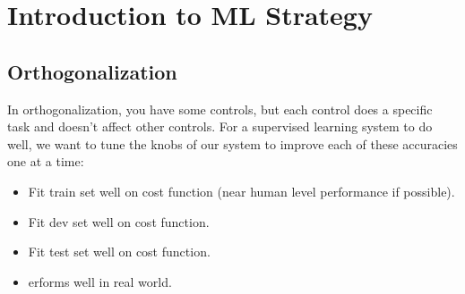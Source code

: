 \section{Introduction to ML Strategy}

\subsection{Orthogonalization}

In orthogonalization, you have some controls, but each control does a specific task and doesn't affect other controls. For a supervised learning system to do well, we want to tune the knobs of our system to improve each of these accuracies one at a time:

\begin{itemize}[wide, labelwidth=!, labelindent=0pt]
\itemsep0em 
    \item Fit train set well on cost function (near human level performance if possible).
    \item Fit dev set well on cost function.
    \item Fit test set well on cost function.
    \item erforms well in real world. \vspace*{-\baselineskip}
\end{itemize}
